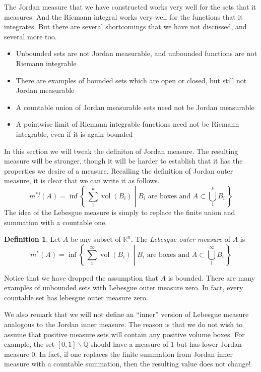 \documentclass[11pt,oneside]{amsbook}
\newcommand{\set}[1]{\left\{\,#1\,\right\}}
\renewcommand{\setminus}{\smallsetminus}
\newcommand{\QQ}{{\mathbb Q}}
\newcommand{\RR}{{\mathbb R}}
\DeclareMathOperator{\vol}{vol}
\theoremstyle{definition}
\theoremstyle{plain}
\theoremstyle{definition}
\newtheorem{defn}[thm]{Definition}
\theoremstyle{remark}
\numberwithin{equation}{section}
\numberwithin{figure}{section}
\begin{document}
The Jordan measure that we have constructed works very well for the sets that it measures. And the Riemann integral works very well for the functions that it integrates. But there are several shortcomings that we have not discussed, and several more too.
\begin{itemize}
\item Unbounded sets are not Jordan measurable, and unbounded functions are not Riemann integrable
\item There are examples of bounded sets which are open or closed, but still not Jordan measurable
\item A countable union of Jordan measurable sets need not be Jordan measurable
\item A pointwise limit of Riemann integrable functions need not be Riemann integrable, even if it is again bounded
\end{itemize}

In this section we will tweak the definiton of Jordan measure. The resulting measure will be stronger, though it will be harder to establish that it has the properties we desire of a measure. Recalling the definition of Jordan outer measure, it is clear that we can write it as follows.
\[m^{*j}(A)=\inf\set{\left.\sum_1^k \vol(B_i)\;\right|\;\text{$B_i$ are boxes and }A\subset\bigcup_1^kB_i}
\]
The idea of the Lebesgue measure is simply to replace the finite union and summation with a countable one.

\begin{defn}
  Let $A$ be any subset of $\RR^n$. The \emph{Lebesgue outer measure} of $A$ is
  \[m^*(A)=\inf\set{\left.\sum_1^\infty \vol(B_i)\;\right|\;\text{$B_i$ are boxes and }A\subset\bigcup_1^\infty B_i}
  \]
\end{defn}

Notice that we have dropped the assumption that $A$ is bounded. There are many examples of unbounded sets with Lebesgue outer measure zero. In fact, every countable set has lebesgue outer measure zero.

We also remark that we will not define an ``inner'' version of Lebesgue measure analogous to the Jordan inner measure. The reason is that we do not wish to assume that positive measure sets will contain any positive volume boxes. For example, the set $[0,1]\setminus\QQ$ should have a measure of $1$ but has lower Jordan measure $0$. In fact, if one replaces the finite summation from Jordan inner measure with a countable summation, then the resulting value does not change!
\end{document}
